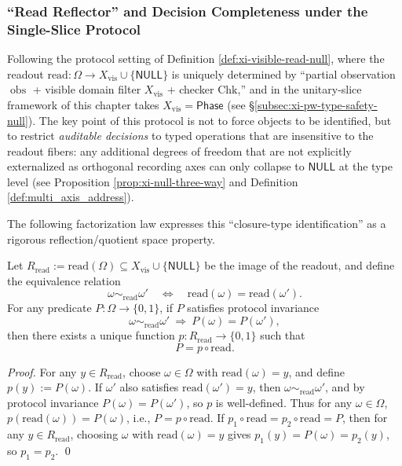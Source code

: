 \subsubsection{``Read Reflector'' and Decision Completeness under the Single-Slice Protocol}\label{subsubsec:xi-read-reflector-completeness}
Following the protocol setting of Definition \ref{def:xi-visible-read-null}, where the readout \(\mathrm{read}:\Omega\to X_{\mathrm{vis}}\cup\{\mathsf{NULL}\}\) is uniquely determined by ``partial observation \(\operatorname{obs}\) + visible domain filter \(X_{\mathrm{vis}}\) + checker \(\mathrm{Chk}\),'' and in the unitary-slice framework of this chapter takes \(X_{\mathrm{vis}}=\mathsf{Phase}\) (see \S\ref{subsec:xi-pw-type-safety-null}).
The key point of this protocol is not to force objects to be identified, but to restrict \emph{auditable decisions} to typed operations that are insensitive to the readout fibers: any additional degrees of freedom that are not explicitly externalized as orthogonal recording axes can only collapse to \(\mathsf{NULL}\) at the type level (see Proposition \ref{prop:xi-null-three-way} and Definition \ref{def:multi_axis_address}).
\par
The following factorization law expresses this ``closure-type identification'' as a rigorous reflection/quotient space property.

\begin{theorem}\label{thm:xi-read-reflector-factorization}
Let
\(
R_{\mathrm{read}}:=\mathrm{read}(\Omega)\subseteq X_{\mathrm{vis}}\cup\{\mathsf{NULL}\}
\)
be the image of the readout, and define the equivalence relation
\[
\omega\sim_{\mathrm{read}}\omega'
\quad\Longleftrightarrow\quad
\mathrm{read}(\omega)=\mathrm{read}(\omega').
\]
For any predicate \(P:\Omega\to\{0,1\}\), if \(P\) satisfies protocol invariance
\[
\omega\sim_{\mathrm{read}}\omega'\ \Longrightarrow\ P(\omega)=P(\omega'),
\]
then there exists a unique function \(p:R_{\mathrm{read}}\to\{0,1\}\) such that
\[
P=p\circ \mathrm{read}.
\]
\end{theorem}

\begin{proof}
For any \(y\in R_{\mathrm{read}}\), choose \(\omega\in\Omega\) with \(\mathrm{read}(\omega)=y\), and define \(p(y):=P(\omega)\).
If \(\omega'\) also satisfies \(\mathrm{read}(\omega')=y\), then \(\omega\sim_{\mathrm{read}}\omega'\), and by protocol invariance \(P(\omega)=P(\omega')\), so \(p\) is well-defined.
Thus for any \(\omega\in\Omega\), \(p(\mathrm{read}(\omega))=P(\omega)\), i.e., \(P=p\circ\mathrm{read}\).
If \(p_1\circ\mathrm{read}=p_2\circ\mathrm{read}=P\), then for any \(y\in R_{\mathrm{read}}\), choosing \(\omega\) with \(\mathrm{read}(\omega)=y\) gives \(p_1(y)=P(\omega)=p_2(y)\), so \(p_1=p_2\).
\qed
\end{proof}

